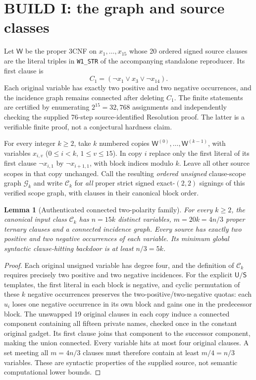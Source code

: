 \documentclass[11pt]{article}
\newtheorem{lemma}[theorem]{Lemma}
\newcommand{\W}{\mathsf{W}}
\newcommand{\U}{\mathsf{U}}
\newcommand{\V}{\mathsf{S}}
\begin{document}
\section{BUILD I: the graph and source classes}
Let $\W$ be the proper 3CNF on $x_1,\dots,x_{15}$ whose 20 ordered signed source clauses are the literal triples in \texttt{W1\_STR} of the accompanying standalone reproducer. Its first clause is
\[
 C_1=(\neg x_1\vee x_3\vee\neg x_{14}).
\]
Each original variable has exactly two positive and two negative occurrences, and the incidence graph remains connected after deleting $C_1$. The finite statements are certified by enumerating $2^{15}=32{,}768$ assignments and independently checking the supplied 76-step source-identified Resolution proof. The latter is a verifiable finite proof, not a conjectural hardness claim.

For every integer $k\ge2$, take $k$ numbered copies $\W^{(0)},\ldots,\W^{(k-1)}$, with variables $x_{i,v}$ ($0\le i<k$, $1\le v\le15$). In copy $i$ replace only the first literal of its first clause $\neg x_{i,1}$ by $\neg x_{i+1,1}$, with block indices modulo $k$. Leave all other source scopes in that copy unchanged. Call the resulting \emph{ordered unsigned} clause-scope graph $\mathcal G_k$ and write $\mathcal C_k$ for \emph{all} proper strict signed exact-$(2,2)$ signings of this verified scope graph, with clauses in their canonical block order.

\begin{lemma}[Authenticated connected two-polarity family]\label{lem:scope}
For every $k\ge2$, the canonical input class $\mathcal C_k$ has $n=15k$ distinct variables, $m=20k=4n/3$ proper ternary clauses and a connected incidence graph. Every source has exactly two positive and two negative occurrences of each variable. Its minimum global syntactic clause-hitting backdoor is at least $n/3=5k$.
\end{lemma}
\begin{proof}
Each original unsigned variable has degree four, and the definition of $\mathcal C_k$ requires precisely two positive and two negative incidences. For the explicit $\U/\V$ templates, the first literal in each block is negative, and cyclic permutation of these $k$ negative occurrences preserves the two-positive/two-negative quotas: each $u_i$ loses one negative occurrence in its own block and gains one in the predecessor block. The unswapped 19 original clauses in each copy induce a connected component containing all fifteen private names, checked once in the constant original gadget. Its first clause joins that component to the successor component, making the union connected. Every variable hits at most four original clauses. A set meeting all $m=4n/3$ clauses must therefore contain at least $m/4=n/3$ variables. These are syntactic properties of the supplied source, not semantic computational lower bounds.
\end{proof}
\end{document}
